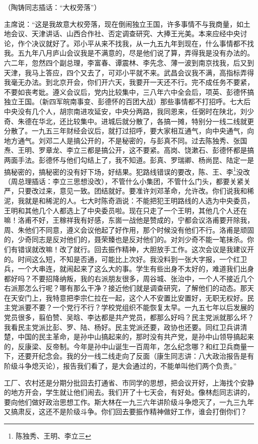 （陶铸同志插话：“大权旁落”）

主席说：“这是我故意大权旁落，现在倒闹独立王国，许多事情不与我商量，如土地会议、天津讲话、山西合作社、否定调查研究、大捧王光美。本来应经中央讨论，作个决议就好了。邓小平从来不找我，从一九五九年到现在，什么事情都不找我。五九年八月庐山会议我是不满意的，尽是他们说了算，弄得我是没有办法的。六二年，忽然四个副总理，李富春、谭震林、李先念、薄一波到南京找我，后又到天津，我马上答应，四个又去了，可邓小平就不来。武昌会议我不满，高指标弄得我毫无办法。到北京开会，你们开六天，我要开一天还不行。完不成任务不要紧，不要如丧考妣。遵义会议后，党内比较集中，三八年六中全会后，项英、彭德怀搞独立王国。（新四军皖南事变、彭德怀的百团大战）那些事情都不打招呼。七大后中央没有几个人，胡宗南进攻延安，中央分两路，我同恩来，任弼时在陕北，刘少奇、朱德在华北，还比较集中。进城后就分散了，各搞一摊，特别分一线二线就更分散了。一九五三年财经会议后，就打过招呼，要大家相互通气，向中央通气，向地方通气。刘邓二人是搞公开的，不是秘密的，与彭真不同。过去陈独秀、张国焘、王明、罗章龙、李立三都是搞公开，这不要紧。高岗、饶漱石、彭德怀都是搞两面手法。彭德怀与他们勾结上了，我不知道。彭真、罗瑞卿、杨尚昆、陆定一是搞秘密的，搞秘密的没有好下场，好结果。犯路线错误的要改，陈、王、李\footnote{陈独秀、王明、李立三}没改（周总理插话：李立三思想没改），不管什么小集团，不管什么门头，都要关紧关严，只要改过来，意见一致。团结就好。要准许刘邓革命，允许改。你们说我和稀泥，我就是和稀泥的人。七大时陈奇涵说：不能把犯王明路线的人选为中央委员，王明和其他几个人都选上了中央委员啦。现在只走了一个王明，其他几个人还在嘛！洛甫不好，王稼祥我有好感，东崮一战他是赞成的，宁都会议洛甫要开除我，周、朱他们不同意，遵义会议他起了好作用，那个时候没有他们不行。洛甫是顽固的，少奇同志是反对他们的，聂荣臻也是反对他们的。对刘少奇不能一笔抹杀。你们有错误就改嘛！改了就行。回去振作精神，大胆放手工作。这次会议是我建议开的。时间这么短，不知是否通，可能比上次好。我没料到一张大字报，一个红卫兵，一个大串连，就闹起来了这么大的事。学生有些出身不太好的，难道我们出身都好吗？不要招降纳叛，我的右派朋友很多，周谷城、张治中，一个人不接近几个右派那怎么行呢？哪有那么干净？接近他们就是调查研究，了解他们的动态。那天在天安门上，我特意把李宗仁拉在一起，这个人不安置比安置好，无职无权好。民主党派要不要？一个党行不行？学校党组织不能恢复太早。一九五七年以后发展的党员很多，翦伯赞、吴晗、李达都是共产党员，都那么好吗？民主党派就那么坏？我看民主党派比彭、罗、陆、杨好。民主党派还要，政协也还要。同红卫兵讲清楚，中国的民主革命，是孙中山搞起来的，那时没有共产党，是孙中山领导搞起来的，反康梁、反帝制。今年是孙中山诞生一百周年，怎么纪念哪？和红卫兵商量一下，还要开纪念会。我的分一线二线走向了反面（康生同志讲：八大政治报告是有阶级斗争熄灭论），报告我们看了，是大会通过的，不能单叫他们两个负责。”

工厂、农村还是分期分批回去打通省、市同学的思想，把会议开好，上海找个安静的地方开会，学生就让他们闹去。我们开了十七天会，有好处。像林彪同志讲的，要向他们做好政治思想工作。斯大林在一九三六年讲阶级斗争熄灭了，一九三九年又搞肃反，这还不是阶级斗争。你们回去要振作精神做好工作，谁会打倒你们？

